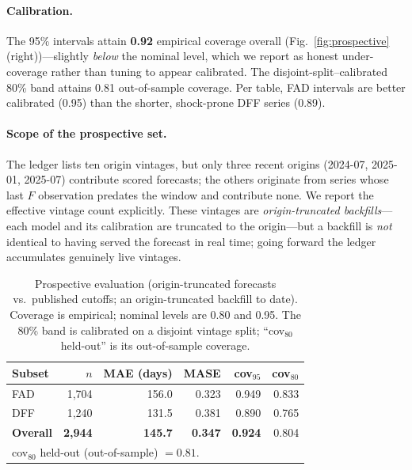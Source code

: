 \documentclass[runningheads]{llncs}
\begin{document}
\paragraph{Calibration.} The 95\% intervals attain \textbf{0.92} empirical coverage
overall (Fig.~\ref{fig:prospective} (right))---slightly \emph{below} the nominal level,
which we report as honest under-coverage rather than tuning to appear calibrated.
The disjoint-split--calibrated 80\% band attains 0.81 out-of-sample coverage. Per
table, FAD intervals are better calibrated (0.95) than the shorter, shock-prone DFF
series (0.89).

\paragraph{Scope of the prospective set.} The ledger lists ten origin vintages, but
only three recent origins (2024-07, 2025-01, 2025-07) contribute scored forecasts;
the others originate from series whose last $F$ observation predates the window and
contribute none. We report the effective vintage count explicitly. These vintages
are \emph{origin-truncated backfills}---each model and its calibration are truncated
to the origin---but a backfill is \emph{not} identical to having served the forecast
in real time; going forward the ledger accumulates genuinely live vintages.

\begin{table}[t]
\centering
\caption{Prospective evaluation (origin-truncated forecasts vs.\ published
cutoffs; an origin-truncated backfill to date).
Coverage is empirical; nominal levels are 0.80 and 0.95. The 80\% band is
calibrated on a disjoint vintage split; ``cov$_{80}$ held-out'' is its
out-of-sample coverage.}
\label{tab:prospective}
\footnotesize
\begin{tabular}{lrrrrr}
\toprule
Subset & $n$ & MAE (days) & MASE & cov$_{95}$ & cov$_{80}$ \\
\midrule
FAD            & 1{,}704 & 156.0 & 0.323 & 0.949 & 0.833 \\
DFF            & 1{,}240 & 131.5 & 0.381 & 0.890 & 0.765 \\
\midrule
\textbf{Overall} & \textbf{2{,}944} & \textbf{145.7} & \textbf{0.347} & \textbf{0.924} & 0.804 \\
\multicolumn{6}{l}{\footnotesize cov$_{80}$ held-out (out-of-sample) $=0.81$.} \\
\bottomrule
\end{tabular}
\end{table}
\end{document}
